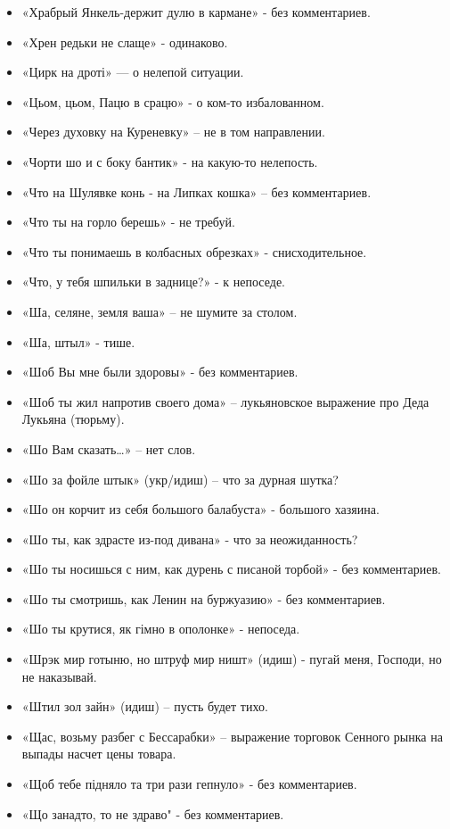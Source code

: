 \begin{itemize}
\item  «Храбрый  Янкель-держит дулю в кармане» - без комментариев.
\item  «Хрен редьки не слаще» - одинаково.
\item  «Цирк на дроті» — о нелепой ситуации.
\item  «Цьом, цьом, Пацю в срацю» - о ком-то избалованном.
\item  «Через духовку на Куреневку» – не в том направлении.
\item  «Чорти шо и с боку бантик» - на какую-то нелепость.
\item  «Что на Шулявке конь - на Липках кошка» – без комментариев.
\item  «Что ты на горло берешь» - не требуй.
\item  «Что ты понимаешь в колбасных обрезках» - снисходительное.
\item  «Что, у тебя шпильки в заднице?» - к непоседе.
\item  «Ша, селяне, земля ваша» – не шумите за столом.
\item  «Ша, штыл» - тише.
\item  «Шоб Вы мне были здоровы» - без комментариев.
\item  «Шоб ты жил напротив своего дома» – лукьяновское выражение про Деда Лукьяна (тюрьму).
\item  «Шо Вам сказать…» – нет слов.
\item  «Шо за фойле штык» (укр/идиш) – что за дурная шутка?
\item  «Шо он корчит из себя большого балабуста» - большого хазяина.
\item  «Шо ты, как здрасте из-под дивана» - что за неожиданность?
\item  «Шо ты носишься с ним, как дурень с писаной торбой» - без комментариев.
\item  «Шо ты смотришь, как Ленин на буржуазию» - без комментариев.
\item  «Шо ты крутися, як гімно в ополонке» - непоседа.
\item  «Шрэк мир готыню, но штруф мир ништ» (идиш) - пугай меня, Господи, но не наказывай.
\item  «Штил зол зайн» (идиш) – пусть будет тихо.
\item  «Щас, возьму разбег с Бессарабки» – выражение торговок Сенного рынка на выпады насчет цены товара.
\item  «Щоб тебе підняло та три рази гепнуло» - без комментариев.
\item  «Що занадто, то не здраво" - без комментариев.

\end{itemize}
